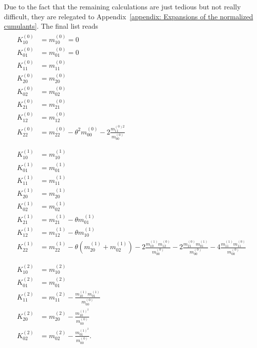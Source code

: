 Due to the fact that the remaining calculations are just tedious but not really difficult, they are relegated to Appendix~\ref{appendix: Expansions of the normalized cumulants}.
The final list reads
\begin{align}
  \label{eq: expansions of cumulants zeroth order}
  &\begin{aligned}
    K_{10}^{(0)} & = m_{10}^{(0)}=0\\
    K_{01}^{(0)} & = m_{01}^{(0)}=0\\
    K_{11}^{(0)} & = m_{11}^{(0)}\\
    K_{20}^{(0)} & = m_{20}^{(0)}\\
    K_{02}^{(0)} & = m_{02}^{(0)}\\
    K_{21}^{(0)} & = m_{21}^{(0)}\\
    K_{12}^{(0)} & = m_{12}^{(0)}\\
    K_{22}^{(0)} & = m_{22}^{(0)} - \theta^2 m_{00}^{(0)} - 2\frac{ m_{11}^{(0)2}}{m_{00}^{(0)}}
  \end{aligned}
  \\\nonumber&\\&
  \label{eq: expansions of cumulants first order}
  \begin{aligned}
    K_{10}^{(1)} & = m_{10}^{(1)}\\
    K_{01}^{(1)} & = m_{01}^{(1)}\\
    K_{11}^{(1)} & = m_{11}^{(1)} \\
    K_{20}^{(1)} & = m_{20}^{(1)} \\
    K_{02}^{(1)} & = m_{02}^{(1)} \\
    K_{21}^{(1)} & = m_{21}^{(1)} - \theta m_{01}^{(1)} \\
    K_{12}^{(1)} & = m_{12}^{(1)} - \theta m_{10}^{(1)} \\
    K_{22}^{(1)} & = m_{22}^{(1)}
      - \theta (m_{20}^{(1)} + m_{02}^{(1)})
      - 2\frac{ m_{10}^{(1)} m_{12}^{(0)} }{m_{00}^{(0)}}
      - 2\frac{ m_{21}^{(0)} m_{01}^{(1)} }{m_{00}^{(0)}}
      - 4\frac{ m_{11}^{(1)} m_{11}^{(0)} }{m_{00}^{(0)}}
  \end{aligned}
\\\nonumber&\\&
  \label{eq: expansions of cumulants second order}
  \begin{aligned}
    K_{10}^{(2)} & = m_{10}^{(2)}\\
    K_{01}^{(2)} & = m_{01}^{(2)}\\
    K_{11}^{(2)} & = m_{11}^{(2)} - \frac{ m_{10}^{(1)}m_{01}^{(1)}}{m_{00}^{(0)}} \\
    K_{20}^{(2)} & = m_{20}^{(2)} - \frac{ m_{10}^{{(1)}^2}}{m_{00}^{(0)}} \\
    K_{02}^{(2)} & = m_{02}^{(2)} - \frac{ m_{01}^{{(1)}^2}}{m_{00}^{(0)}}.
  \end{aligned}
\end{align}

